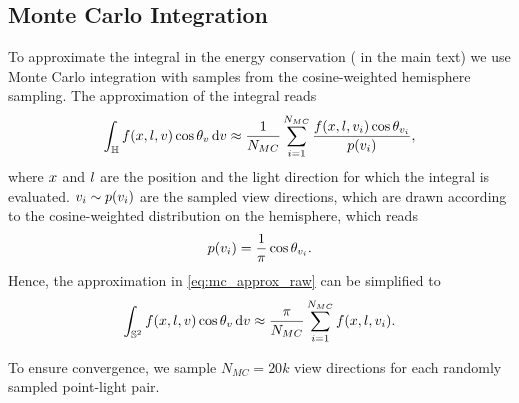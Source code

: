 \subsection{Monte Carlo Integration}
\label{sec:supp:mc_integration}

To approximate the integral in the energy conservation
(\iftoggle{arxiv}{\cref{eq:brdf_energy_conservation}}{Eq. (4)} in the main text)
we use Monte Carlo integration with samples from the cosine-weighted hemisphere sampling. The approximation of the integral reads
\begin{equation}\label{eq:mc_approx_raw}
    \int_{\mathbb{H}} f(x, l, v)\cos{\theta_{v}} \,\mathrm{d}v \approx \frac{1}{N_{MC}}\sum_{i=1}^{N_{MC}}\frac{f(x, l, v_i)\cos{\theta_{v_i}}}{p(v_i)},
\end{equation}
where $x$ and $l$ are the position and the light direction for which the integral is evaluated. $v_i\sim p(v_i)$ are the sampled view directions, which are drawn according to the cosine-weighted distribution on the hemisphere, which reads
\begin{equation}
    p(v_i) = \frac{1}{\pi}\cos{\theta_{v_i}}.
\end{equation}
Hence, the approximation in \cref{eq:mc_approx_raw} can be simplified to
\begin{equation}
    \int_{\mathbb{S}^2} f(x, l, v)\cos{\theta_{v}} \,\mathrm{d}v \approx \frac{\pi}{N_{MC}}\sum_{i=1}^{N_{MC}}f(x, l, v_i).
\end{equation}

To ensure convergence, we sample $N_{MC}=20k$ view directions for each randomly sampled point-light pair.